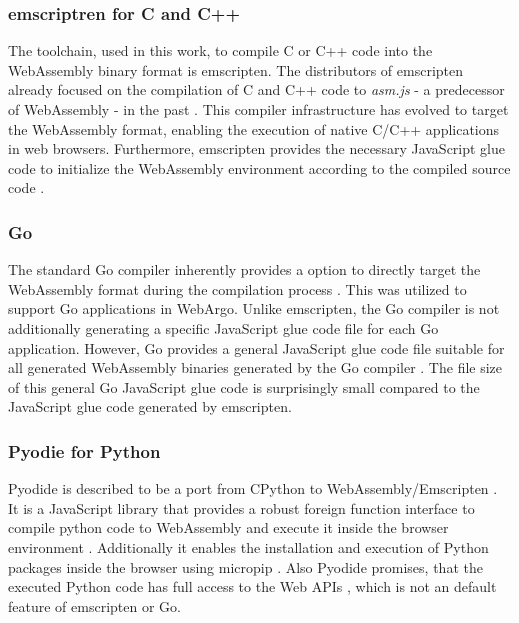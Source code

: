 \subsubsection{emscriptren for C and C++}
\label{subsec:methodology:wasm:cpp}
The toolchain, used in this work, to compile C or C++ code into the WebAssembly binary format is emscripten. The distributors of emscripten already focused on the compilation of C and C++ code to \emph{asm.js} - a predecessor of WebAssembly - in the past \cite{methodology:emcc}. This compiler infrastructure has evolved to target the WebAssembly format, enabling the execution of native C/C++ applications in web browsers. Furthermore, emscripten provides the necessary JavaScript glue code to initialize the WebAssembly environment according to the compiled source code \cite{methodology:emcc}.

\subsubsection{Go}
\label{subsec:methodology:wasm:go}
The standard Go compiler inherently provides a option to directly target the WebAssembly format during the compilation process \cite{methodology:go}. This was utilized to support Go applications in WebArgo. Unlike emscripten, the Go compiler is not additionally generating a specific JavaScript glue code file for each Go application. However, Go provides a general JavaScript glue code file suitable for all generated WebAssembly binaries generated by the Go compiler \cite{methodology:go}. The file size of this general Go JavaScript glue code is surprisingly small compared to the JavaScript glue code generated by emscripten.

\subsubsection{Pyodie for Python}
\label{subsec:methodology:wasm:python}
Pyodide is described to be a port from CPython to WebAssembly/Emscripten \cite{methodology:pyodie}. It is a JavaScript library that provides a robust foreign function interface to compile python code to WebAssembly and execute it inside the browser environment \cite{methodology:pyodie}. Additionally it enables the installation and execution of Python packages inside the browser using micropip \cite{methodology:pyodie}. Also Pyodide promises, that the executed Python code has full access to the Web \ac{API}s \cite{methodology:pyodie}, which is not an default feature of emscripten or Go.

